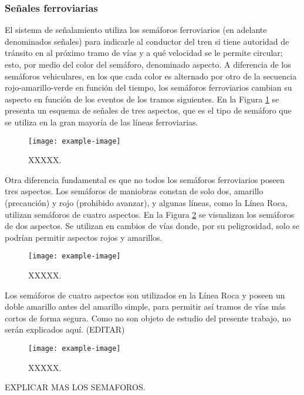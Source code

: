 \subsubsection{Señales ferroviarias}

El sistema de señalamiento utiliza los semáforos ferroviarios (en adelante denominados señales) para indicarle al conductor del tren si tiene autoridad de tránsito en al próximo tramo de vías y a qué velocidad se le permite circular; esto, por medio del color del semáforo, denominado aspecto. A diferencia de los semáforos vehiculares, en los que cada color es alternado por otro de la secuencia rojo-amarillo-verde en función del tiempo, los semáforos ferroviarios cambian su aspecto en función de los eventos de los tramos siguientes. En la Figura \ref{fig:signal_1} se presenta un esquema de señales de tres aspectos, que es el tipo de semáforo que se utiliza en la gran mayoría de las líneas ferroviarias.

    \begin{figure}[!h]
        \centering
        \texttt{[image: example-image]}
        \centering\caption{XXXXX.}
        \label{fig:signal_1}
    \end{figure}

Otra diferencia fundamental es que no todos los semáforos ferroviarios poseen tres aspectos. Los semáforos de maniobras constan de solo dos, amarillo (precaución) y rojo (prohibido avanzar), y algunas líneas, como la Línea Roca, utilizan semáforos de cuatro aspectos. En la Figura \ref{fig:signal_2} se visualizan los semáforos de dos aspectos. Se utilizan en cambios de vías donde, por su peligrosidad, solo se podrían permitir aspectos rojos y amarillos.

    \begin{figure}[!h]
        \centering
        \texttt{[image: example-image]}
        \centering\caption{XXXXX.}
        \label{fig:signal_2}
    \end{figure}

Los semáforos de cuatro aspectos son utilizados en la Línea Roca y poseen un doble amarillo antes del amarillo simple, para permitir así tramos de vías más cortos de forma segura. Como no son objeto de estudio del presente trabajo, no serán explicados aquí. (EDITAR)

    \begin{figure}[!h]
        \centering
        \texttt{[image: example-image]}
        \centering\caption{XXXXX.}
        \label{fig:signal_3}
    \end{figure}

EXPLICAR MAS LOS SEMAFOROS.